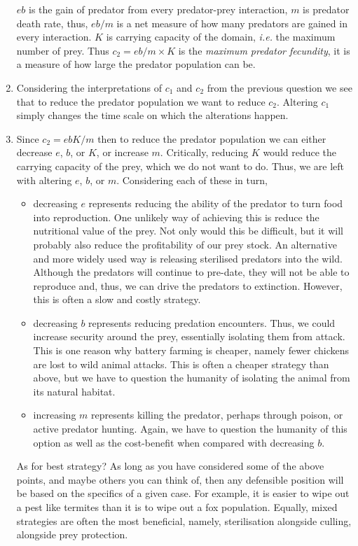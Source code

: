 \documentclass[10pt]{article}
\newcommand{\ie}{\emph{i.e.} }
\begin{document}
\begin{Answ}
\begin{enumerate}
$eb$ is the gain of predator from every predator-prey interaction, $m$ is predator death rate, thus, $eb/m$ is a net measure of how many predators are gained in every interaction.  $K$ is carrying capacity of the domain, \ie the maximum number of prey. Thus $c_2=eb/m \times K$ is the \textit{maximum predator fecundity}, it is a measure of how large the predator population can be.
\item Considering the interpretations of $c_1$ and $c_2$ from the previous question we see that to reduce the predator population we want to reduce $c_2$. Altering $c_1$ simply changes the time scale on which the alterations happen.

\item Since $c_2=ebK/m$ then to reduce the predator population we can either decrease $e$, $b$, or $K$, or increase $m$. Critically, reducing $K$ would reduce the carrying capacity of the prey, which we do not want to do. Thus, we are left with altering $e$, $b$, or $m$. Considering each of these in turn,
\begin{itemize}
\item decreasing $e$ represents reducing the ability of the predator to turn food into reproduction. One unlikely way of achieving this is reduce the nutritional value of the prey. Not only would this be difficult, but it will probably also reduce the profitability of our prey stock. An alternative and more widely used way is releasing sterilised predators into the wild. Although the predators will continue to pre-date, they will not be able to reproduce and, thus, we can drive the predators to extinction. However, this is often a slow and costly strategy.
\item decreasing $b$ represents reducing predation encounters. Thus, we could increase security around the prey, essentially isolating them from attack. This is one reason why battery farming is cheaper, namely fewer chickens are lost to wild animal attacks. This is often a cheaper strategy than above, but we have to question the humanity of isolating the animal from its natural habitat.
\item increasing $m$ represents killing the predator, perhaps through poison, or active predator hunting. Again, we have to question the humanity of this option as well as the cost-benefit when compared with decreasing $b$.
\end{itemize}
As for best strategy? As long as you have considered some of the above points, and maybe others you can think of, then any defensible position will be based on the specifics of a given case. For example, it is easier to wipe out a pest like termites than it is to wipe out a fox population. Equally, mixed strategies are often the most beneficial, namely, sterilisation alongside culling, alongside prey protection.
\end{enumerate}
\end{Answ}
\end{document}
